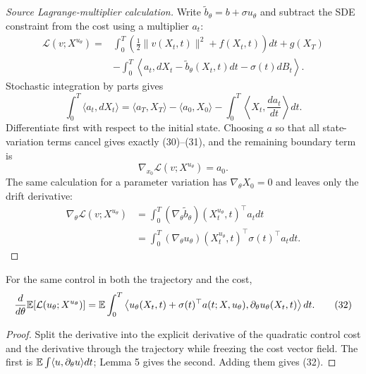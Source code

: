 \begin{proof}[Source Lagrange-multiplier calculation]
Write $\widetilde b_\theta=b+\sigma u_\theta$ and subtract the SDE constraint from the cost using a multiplier $a_t$:
\begin{align*}
 \mathcal L(v;X^{u_\theta})
 ={}&\int_0^T\left(\frac12\|v(X_t,t)\|^2+f(X_t,t)\right)dt+g(X_T)\\
 &-\int_0^T\left\langle a_t,dX_t-\widetilde b_\theta(X_t,t)dt-\sigma(t)dB_t\right\rangle.
 \tag{186}
\end{align*}
Stochastic integration by parts gives
\begin{equation*}
 \int_0^T\langle a_t,dX_t\rangle
 =\langle a_T,X_T\rangle-\langle a_0,X_0\rangle
 -\int_0^T\left\langle X_t,\frac{da_t}{dt}\right\rangle dt.
 \tag{187}
\end{equation*}
Differentiate first with respect to the initial state.  Choosing $a$ so that all state-variation terms cancel gives exactly (30)--(31), and the remaining boundary term is
\begin{equation*}
 \nabla_{x_0}\mathcal L(v;X^{u_\theta})=a_0.
 \tag{190}
\end{equation*}
The same calculation for a parameter variation has $\nabla_\theta X_0=0$ and leaves only the drift derivative:
\begin{align*}
 \nabla_\theta\mathcal L(v;X^{u_\theta})
 &=\int_0^T
 (\nabla_\theta\widetilde b_\theta)(X_t^{u_\theta},t)^\top a_tdt\\
 &=\int_0^T
 (\nabla_\theta u_\theta)(X_t^{u_\theta},t)^\top\sigma(t)^\top a_tdt.
 \tag{192}
\end{align*}
\end{proof}

\begin{proposition}
For the same control in both the trajectory and the cost,
\begin{equation*}
 \frac{d}{d\theta}\mathbb{E}[\mathcal L(u_\theta;X^{u_\theta})]
 =\mathbb{E}\int_0^T
 \left\langle
 u_\theta(X_t,t)+\sigma(t)^\top a(t;X,u_\theta),
 \partial_\theta u_\theta(X_t,t)
 \right\rangle dt.
 \tag{32}
\end{equation*}
\end{proposition}
\begin{proof}
Split the derivative into the explicit derivative of the quadratic control cost and the derivative through the trajectory while freezing the cost vector field.  The first is
$\mathbb{E}\int\langle u,\partial_\theta u\rangle dt$; Lemma 5 gives the second.  Adding them gives (32).
\end{proof}

